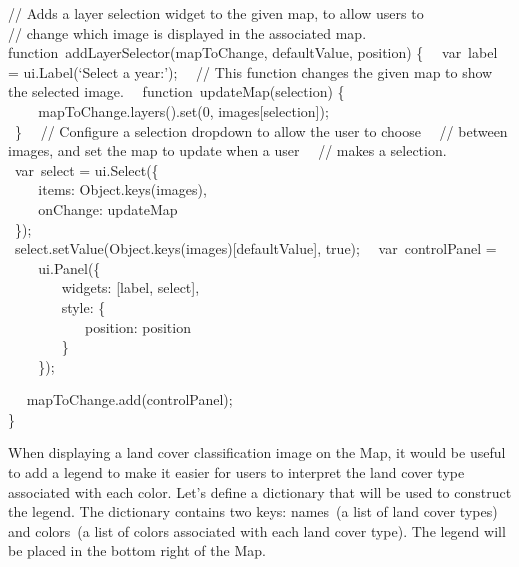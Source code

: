 \documentclass[
  letterpaper,
  DIV=11,
  numbers=noendperiod]{scrreprt}
\begin{document}
// Adds a layer selection widget to the given map, to allow users to\\
// change which image is displayed in the associated map.\\
function~addLayerSelector(mapToChange, defaultValue, position) \{~
~var~label = ui.Label(`Select a year:');~ ~// This function changes the
given map to show the selected image.~ ~function~updateMap(selection)
\{\\
\hspace*{0.333em} ~ ~ ~mapToChange.layers().set(0,
images{[}selection{]});\\
\hspace*{0.333em} ~\}~ ~// Configure a selection dropdown to allow the
user to choose~ ~// between images, and set the map to update when a
user~ ~// makes a selection.~ ~var~select = ui.Select(\{\\
\hspace*{0.333em} ~ ~ ~items: Object.keys(images),\\
\hspace*{0.333em} ~ ~ ~onChange: updateMap\\
\hspace*{0.333em} ~\});\\
\hspace*{0.333em}
~select.setValue(Object.keys(images){[}defaultValue{]}, true);~
~var~controlPanel =~ ~ ~ ~ui.Panel(\{\\
\hspace*{0.333em} ~ ~ ~ ~ ~widgets: {[}label, select{]},\\
\hspace*{0.333em} ~ ~ ~ ~ ~style: \{\\
\hspace*{0.333em} ~ ~ ~ ~ ~ ~ ~position: position\\
\hspace*{0.333em} ~ ~ ~ ~ ~\}\\
\hspace*{0.333em} ~ ~ ~\});

~ ~mapToChange.add(controlPanel);\\
\}

When displaying a land cover classification image on the Map, it would
be useful to add a legend to make it easier for users to interpret the
land cover type associated with each color. Let's define a dictionary
that will be used to construct the legend. The dictionary contains two
keys: names~(a list of land cover types) and colors~(a list of colors
associated with each land cover type). The legend will be placed in the
bottom right of the Map. ~ ~
\end{document}
